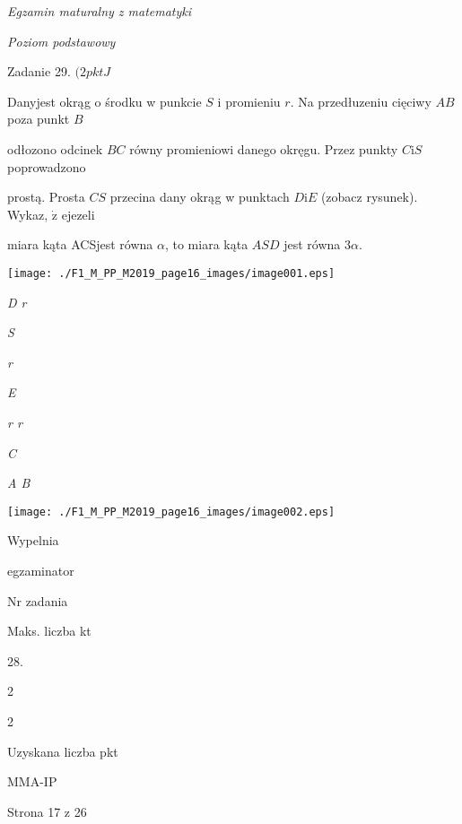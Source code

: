\documentclass[a4paper,12pt]{article}
\begin{document}
{\it Egzamin maturalny z matematyki}

{\it Poziom podstawowy}

Zadanie 29. $(2pktJ$

Danyjest okrąg o środku w punkcie $S$ i promieniu $r$. Na przedłuzeniu cięciwy $AB$ poza punkt $B$

odłozono odcinek $BC$ równy promieniowi danego okręgu. Przez punkty $C\mathrm{i}S$ poprowadzono

prostą. Prosta $CS$ przecina dany okrąg w punktach $D\mathrm{i}E$ (zobacz rysunek). Wykaz, $\dot{\mathrm{z}}$ ejezeli

miara kąta ACSjest równa $\alpha$, to miara kąta $ASD$ jest równa $3\alpha.$
\begin{center}
\texttt{[image: ./F1\_M\_PP\_M2019\_page16\_images/image001.eps]}
\end{center}
{\it D  r}

{\it S}

{\it r}

{\it E}

{\it r  r}

{\it C}

{\it A  B}
\begin{center}
\texttt{[image: ./F1\_M\_PP\_M2019\_page16\_images/image002.eps]}
\end{center}
Wypelnia

egzaminator

Nr zadania

Maks. liczba kt

28.

2

2

Uzyskana liczba pkt

MMA-IP

Strona 17 z 26
\end{document}

